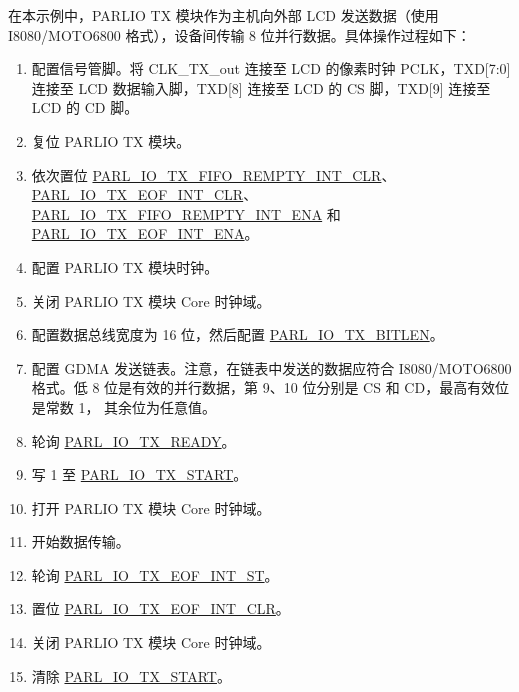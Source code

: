 \documentclass[main\_\_CN.tex]{subfiles}
\begin{document}
在本示例中，PARLIO TX 模块作为主机向外部 LCD 发送数据（使用 I8080/MOTO6800 格式），设备间传输 8 位并行数据。具体操作过程如下：

\begin{enumerate}
    \item 配置信号管脚。将 CLK\_TX\_out 连接至 LCD 的像素时钟 PCLK，TXD[7:0] 连接至 LCD 数据输入脚，TXD[8] 连接至 LCD 的 CS 脚，TXD[9] 连接至 LCD 的 CD 脚。
    \item 复位 PARLIO TX 模块。
    \item 依次置位 \hyperref[fielddesc:PARLIOTXFIFOREMPTYINTCLR]{PARL\_IO\_TX\_FIFO\_REMPTY\_INT\_CLR}、\hyperref[fielddesc:PARLIOTXEOFINTCLR]{PARL\_IO\_TX\_EOF\_INT\_CLR}、\hyperref[fielddesc:PARLIOTXFIFOREMPTYINTENA]{PARL\_IO\_TX\_FIFO\_REMPTY\_INT\_ENA} 和  \hyperref[fielddesc:PARLIOTXEOFINTENA]{PARL\_IO\_TX\_EOF\_INT\_ENA}。
    \item 配置 PARLIO TX 模块时钟。
    \item 关闭 PARLIO TX 模块 Core 时钟域。
    \item 配置数据总线宽度为 16 位，然后配置 \hyperref[fielddesc:PARLIOTXBITLEN]{PARL\_IO\_TX\_BITLEN}。
    \item 配置 GDMA 发送链表。注意，在链表中发送的数据应符合 I8080/MOTO6800 格式。低 8 位是有效的并行数据，第 9、10 位分别是 CS 和 CD，最高有效位是常数 1， 其余位为任意值。
    \item 轮询 \hyperref[fielddesc:PARLIOTXREADY]{PARL\_IO\_TX\_READY}。
    \item 写 1 至 \hyperref[fielddesc:PARLIOTXSTART]{PARL\_IO\_TX\_START}。
    \item 打开 PARLIO TX 模块 Core 时钟域。
    \item 开始数据传输。
    \item 轮询 \hyperref[fielddesc:PARLIOTXEOFINTST]{PARL\_IO\_TX\_EOF\_INT\_ST}。
    \item 置位 \hyperref[fielddesc:PARLIOTXEOFINTCLR]{PARL\_IO\_TX\_EOF\_INT\_CLR}。
    \item 关闭 PARLIO TX 模块 Core 时钟域。
    \item 清除 \hyperref[fielddesc:PARLIOTXSTART]{PARL\_IO\_TX\_START}。
\end{enumerate}




\end{document}
